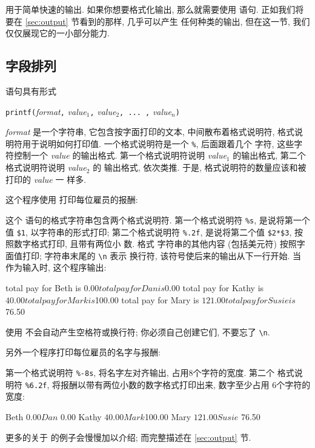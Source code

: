 \print 用于简单快速的输出. 如果你想要格式化输出, 那么就需要使用 \printf
语句. 正如我们将要在 \ref{sec:output} 节看到的那样, \printf 几乎可以产生
任何种类的输出, 但在这一节, 我们仅仅展现它的一小部分能力.

\subsection{字段排列}
\label{subsec:lining_up_fields}

\printf 语句具有形式
\begin{pattern}
    \texttt{printf(}\textit{format}\texttt{,} \textit{value$_1$}\texttt{,}
    \textit{value$_2$}\texttt{, ... ,} \textit{value$_n$}\texttt{)}
\end{pattern}
\textit{format} 是一个字符串, 它包含按字面打印的文本, 中间散布着格式说明符,
格式说明符用于说明如何打印值. 一个格式说明符是一个 \verb'%', 后面跟着几个
字符, 这些字符控制一个 \textit{value} 的输出格式. 第一个格式说明符说明
\textit{value$_1$} 的输出格式, 第二个格式说明符说明 \textit{value$_2$} 的
输出格式, 依次类推. 于是, 格式说明符的数量应该和被打印的 \textit{value} 一
样多.

这个程序使用 \printf 打印每位雇员的报酬:
这个 \printf 语句的格式字符串包含两个格式说明符. 第一个格式说明符
\verb'%s', 是说将第一个值 \verb'$1', 以字符串的形式打印; 第二个格式说明符
\verb'%.2f', 是说将第二个值 \verb'$2*$3', 按照数字格式打印, 且带有两位小
数. 格式
字符串的其他内容 (包括美元符) 按照字面值打印; 字符串末尾的 \verb'\n' 表示
换行符, 该符号使后来的输出从下一行开始. 当  作为输入时,
这个程序输出:
\begin{myverb}
    total pay for Beth is $0.00
    total pay for Dan is $0.00
    total pay for Kathy is $40.00
    total pay for Mark is $100.00
    total pay for Mary is $121.00
    total pay for Susie is $76.50
\end{myverb}
使用 \printf 不会自动产生空格符或换行符; 你必须自己创建它们, 不要忘了
\verb'\n'.

另外一个程序打印每位雇员的名字与报酬:
第一个格式说明符 \verb'%-8s', 将名字左对齐输出, 占用8个字符的宽度. 第二个
格式说明符 \verb'%6.2f', 将报酬以带有两位小数的数字格式打印出来,
数字至少占用
6个字符的宽度:
\begin{myverb}
    Beth     $  0.00
    Dan      $  0.00
    Kathy    $ 40.00
    Mark     $100.00
    Mary     $121.00
    Susie    $ 76.50
\end{myverb}
更多的关于 \printf 的例子会慢慢加以介绍; 而完整描述在
\ref{sec:output} 节.

